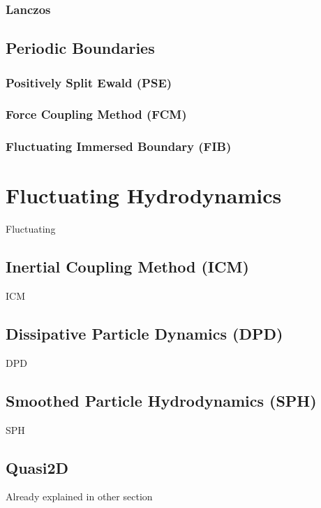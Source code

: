 \documentclass[ twoside,openright,titlepage,numbers=noenddot,%
headinclude,footinclude,cleardoublepage=empty,abstract=on,
BCOR=5mm,paper=a4,fontsize=11pt
]{scrreprt}
\begin{document}
\subsection{Lanczos}

\section{Periodic Boundaries}

\subsection{Positively Split Ewald (PSE)}

\subsection{Force Coupling Method (FCM)}

\subsection{Fluctuating Immersed Boundary (FIB)}

\chapter{Fluctuating Hydrodynamics}

Fluctuating

\section{Inertial Coupling Method (ICM)}

ICM

\section{Dissipative Particle Dynamics (DPD)}

DPD

\section{Smoothed Particle Hydrodynamics (SPH)}


SPH

\section{Quasi2D}

Already explained in other section
\end{document}

